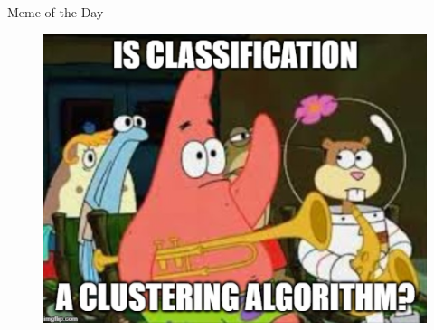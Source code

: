 \begin{frame}{Meme of the Day}{}
	\begin{figure}
		\includegraphics[scale=0.5]{12_clustering/02_img/meme_of_the_day}
	\end{figure}
\end{frame}


\makethanks

